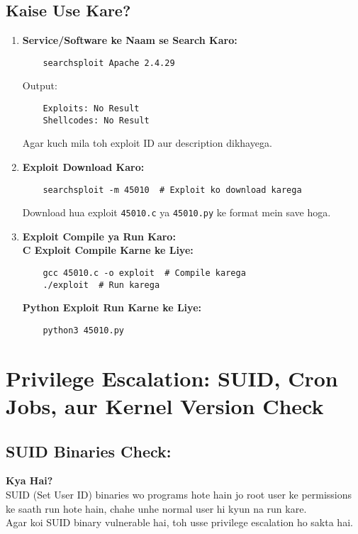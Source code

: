 \documentclass[a4paper]{article}
\begin{document}
\subsection{Kaise Use Kare?}
\begin{enumerate}
  \item \textbf{Service/Software ke Naam se Search Karo:} \\
    \begin{lstlisting}
    searchsploit Apache 2.4.29  
    \end{lstlisting}
    Output: \\
    \begin{lstlisting}
    Exploits: No Result  
    Shellcodes: No Result  
    \end{lstlisting}
    Agar kuch mila toh exploit ID aur description dikhayega.
  \item \textbf{Exploit Download Karo:} \\
    \begin{lstlisting}
    searchsploit -m 45010  # Exploit ko download karega
    \end{lstlisting}
    Download hua exploit \texttt{45010.c} ya \texttt{45010.py} ke format mein save hoga.
  \item \textbf{Exploit Compile ya Run Karo:} \\
    \textbf{C Exploit Compile Karne ke Liye:} \\
    \begin{lstlisting}
    gcc 45010.c -o exploit  # Compile karega
    ./exploit  # Run karega
    \end{lstlisting}
    \textbf{Python Exploit Run Karne ke Liye:} \\
    \begin{lstlisting}
    python3 45010.py  
    \end{lstlisting}
\end{enumerate}

\section{Privilege Escalation: SUID, Cron Jobs, aur Kernel Version Check}
\subsection{SUID Binaries Check:}
\textbf{Kya Hai?} \\
SUID (Set User ID) binaries wo programs hote hain jo root user ke permissions ke saath run hote hain, chahe unhe normal user hi kyun na run kare. \\
Agar koi SUID binary vulnerable hai, toh usse privilege escalation ho sakta hai. \\
\end{document}
